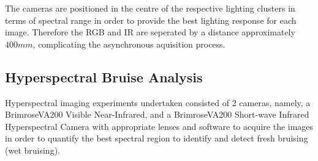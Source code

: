 \documentclass[fleqn,twoside]{article}
\begin{document}
The cameras are positioned in the centre of the respective lighting clusters in terms of spectral range in order to provide the best lighting response for each image. Therefore the RGB and IR are seperated by a distance approximately $400mm$, complicating the asynchronous aquisition process.




\subsection{Hyperspectral Bruise Analysis}

Hyperspectral imaging experiments undertaken consisted of 2 cameras, namely, a Brimrose\textregistered VA200 Visible Near-Infrared, and a Brimrose\textregistered VA200 Short-wave Infrared Hyperspectral Camera with appropriate lenses and software to acquire the images in order to quantify the best spectral region to identify and detect fresh bruising (wet bruising). 
\end{document}
